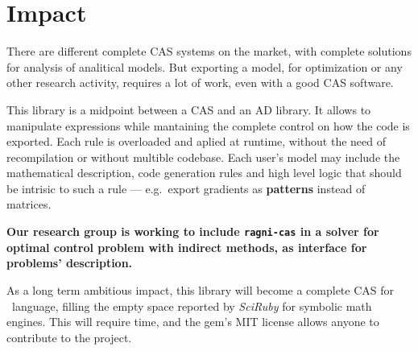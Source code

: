 
\section{Impact}
\label{sec:impact}

There are different complete CAS systems on the market, with complete solutions for analysis of analitical models. But exporting a model, for optimization or any other research activity, requires a lot of work, even with a good CAS software.

This library is a midpoint between a CAS and an AD library. It allows to manipulate expressions while mantaining the complete control on how the code is exported. Each rule is overloaded and aplied at runtime, without the need of recompilation or without multible codebase. Each user's model may include the mathematical description, code generation rules and high level logic that should be intrisic to such a rule --- e.g.~export gradients as \textbf{patterns} instead of matrices.

\textbf{Our research group is working to include \texttt{ragni-cas} in a solver for optimal control problem with indirect methods, as interface for problems' description. \cite{biral2016notes}}

As a long term ambitious impact, this library will become a complete CAS for \Ruby~language, filling the empty space reported by \emph{SciRuby} for symbolic math engines. This will require time, and the gem's MIT license allows anyone to contribute to the project.
